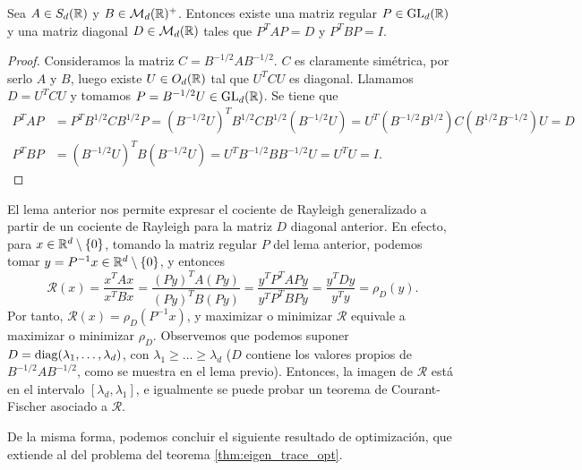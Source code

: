 \begin{lem} \label{lem:diag_simult}
    Sea $A \in S_d(\mathbb{R})$ y $B \in \mathcal{M}_d(\mathbb{R})^+$. Entonces existe una matriz regular $P \in \operatorname{GL}_d(\mathbb{R})$ y una matriz diagonal $D \in \mathcal{M}_d(\mathbb{R})$ tales que $P^TAP = D$ y $P^TBP = I$.
\end{lem}

\begin{proof}
    Consideramos la matriz $C = B^{-1/2}AB^{-1/2}$. $C$ es claramente simétrica, por serlo $A$ y $B$, luego existe $U \in O_d(\mathbb{R})$ tal que $U^TCU$ es diagonal. Llamamos $D = U^TCU$ y tomamos $P = B^{-1/2}U \in \operatorname{GL}_d(\mathbb{R})$. Se tiene que
    \begin{align*}
        P^TAP &= P^TB^{1/2}CB^{1/2}P = (B^{-1/2}U)^TB^{1/2}CB^{1/2}(B^{-1/2}U) = U^T(B^{-1/2}B^{1/2})C(B^{1/2}B^{-1/2})U = D \\
        P^TBP &= (B^{-1/2}U)^TB(B^{-1/2}U) = U^TB^{-1/2}BB^{-1/2}U = U^TU = I.
    \end{align*}
\end{proof}

El lema anterior nos permite expresar el cociente de Rayleigh generalizado a partir de un cociente de Rayleigh para la matriz $D$ diagonal anterior. En efecto, para $x \in \mathbb{R}^d \setminus \{0\}$, tomando la matriz regular $P$ del lema anterior, podemos tomar $y = P^{-1}x \in \mathbb{R}^d\setminus\{0\}$, y entonces
\[ \mathcal{R}(x) = \frac{x^TAx}{x^TBx} = \frac{(Py)^TA(Py)}{(Py)^TB(Py)} = \frac{y^TP^TAPy}{y^TP^TBPy} = \frac{y^TDy}{y^Ty} = \rho_D(y). \]
Por tanto, $\mathcal{R}(x) = \rho_D(P^{-1}x)$, y maximizar o minimizar $\mathcal{R}$ equivale a maximizar o minimizar $\rho_D$. Observemos que podemos suponer $D = \operatorname{diag}(\lambda_1,\dots,\lambda_d)$, con $\lambda_1 \ge \dots \ge \lambda_d$ ($D$ contiene los valores propios de $B^{-1/2}AB^{-1/2}$, como se muestra en el lema previo). Entonces, la imagen de $\mathcal{R}$ está en el intervalo $[\lambda_d,\lambda_1]$, e igualmente se puede probar un teorema de Courant-Fischer asociado a $\mathcal{R}$.

De la misma forma, podemos concluir el siguiente resultado de optimización, que extiende al del problema del teorema \ref{thm:eigen_trace_opt}.

\begin{comment}
Notemos además que para la base canónica $\{e_1,\dots,e_d\}$ de $\R^d$, se tiene que $\rho_D(e_i) = \lambda_i$, y en consecuencia $\mathcal{R}(Pe_i) = \lambda_i$. Por otra parte, de $P^TAP = D$ y $P^TBP = I$, se deduce que
\[ D = P^TAP = (P^TBP)^{-1}(P^TAP) = P^{-1}B^{-1}P^{-T}P^TAP = P^{-1}B^{-1}AP, \]
luego $D$ es una matriz diagonal semejante a $B^{-1}A$. Por tanto, si $v_1, \dots, v_d$ son vectores propios de $B^{-1}A$ asociados a $\lambda_1,\dots,\lambda_d$, se tiene que $Av_i = \lambda_iBv_i$, y entonces
\[ \mathcal{R}(v_i) = \frac{v_i^TAv_i}{v_i^TBv_i} = \lambda_i\frac{v_i^TBv_i}{v_i^TBv_i} = \lambda_i, \]
y por tanto estos vectores propios maximizan el problema del teorema \ref{thm:eigen_trace_opt} asociado a la matriz $D$. Podemos concluir el siguiente resultado sobre optimización, que extiende al del problema del teorema \ref{thm:eigen_trace_opt}.
\end{comment}

